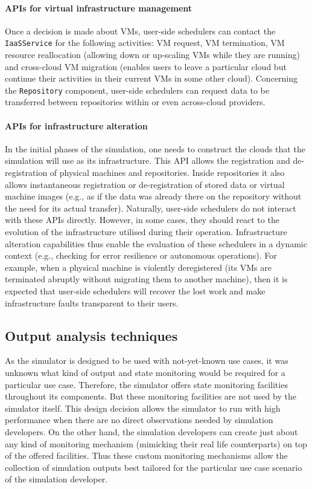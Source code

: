 \documentclass[sort, compress, 5p]{elsarticle}
\begin{document}
\paragraph{APIs for virtual infrastructure management} Once a decision is made about VMs, user-side schedulers can contact the \verb+IaaSService+ for the following activities: VM request, VM termination, VM resource reallocation (allowing down or up-scaling VMs while they are running) and cross-cloud VM migration (enables users to leave a particular cloud but continue their activities in their current VMs in some other cloud). Concerning the \verb+Repository+ component, user-side schedulers can request data to be transferred between repositories within or even across-cloud providers.

\paragraph{APIs for infrastructure alteration} In the initial phases of the simulation, one needs to construct the clouds that the simulation will use as its infrastructure. This API allows the registration and de-registration of physical machines and repositories. Inside repositories it also allows instantaneous registration or de-registration of stored data or virtual machine images (e.g., as if the data was already there on the repository without the need for its actual transfer). Naturally, user-side schedulers do not interact with these APIs directly. However, in some cases, they should react to the evolution of the infrastructure utilised during their operation. Infrastructure alteration capabilities thus enable the evaluation of these schedulers in a dynamic context (e.g., checking for error resilience or autonomous operations). For example, when a physical machine is violently deregistered (its VMs are terminated abruptly without migrating them to another machine), then it is expected that user-side schedulers will recover the lost work and make infrastructure faults transparent to their users.

\subsection{Output analysis techniques}

As the simulator is designed to be used with not-yet-known use cases, it was unknown what kind of output and state monitoring would be required for a particular use case. Therefore, the simulator offers state monitoring facilities throughout its components. But these monitoring facilities are not used by the simulator itself. This design decision allows the simulator to run with high performance when there are no direct observations needed by simulation developers. On the other hand, the simulation developers can create just about any kind of monitoring mechanism (mimicking their real life counterparts) on top of the offered facilities. Thus these custom monitoring mechanisms allow the collection of simulation outputs best tailored for the particular use case scenario of the simulation developer. 
\end{document}
